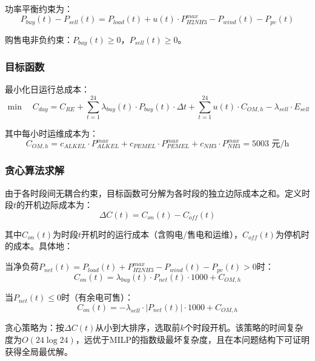 功率平衡约束为：
\begin{equation}
P_{buy}(t) - P_{sell}(t) = P_{load}(t) + u(t) \cdot P_{H2NH3}^{max} - P_{wind}(t) - P_{pv}(t)
\end{equation}

购售电非负约束：$P_{buy}(t) \geq 0$，$P_{sell}(t) \geq 0$。

\subsubsection{目标函数}

最小化日运行总成本：
\begin{equation}\label{eq:q2_obj}
\min \quad C_{day} = C_{RE} + \sum_{t=1}^{24} \lambda_{buy}(t) \cdot P_{buy}(t) \cdot \Delta t + \sum_{t=1}^{24} u(t) \cdot C_{OM,h} - \lambda_{sell} \cdot E_{sell}
\end{equation}

其中每小时运维成本为：
\begin{equation}
C_{OM,h} = c_{ALKEL} \cdot P_{ALKEL}^{max} + c_{PEMEL} \cdot P_{PEMEL}^{max} + c_{NH3} \cdot P_{NH3}^{max} = 5003 \text{ 元/h}
\end{equation}

\subsubsection{贪心算法求解}

由于各时段间无耦合约束，目标函数可分解为各时段的独立边际成本之和。定义时段$t$的开机边际成本为：
\begin{equation}\label{eq:greedy_marginal}
\Delta C(t) = C_{on}(t) - C_{off}(t)
\end{equation}

其中$C_{on}(t)$为时段$t$开机时的运行成本（含购电/售电和运维），$C_{off}(t)$为停机时的成本。具体地：

当净负荷$P_{net}(t) = P_{load}(t) + P_{H2NH3}^{max} - P_{wind}(t) - P_{pv}(t) > 0$时：
\begin{equation}
C_{on}(t) = \lambda_{buy}(t) \cdot P_{net}(t) \cdot 1000 + C_{OM,h}
\end{equation}

当$P_{net}(t) \leq 0$时（有余电可售）：
\begin{equation}
C_{on}(t) = -\lambda_{sell} \cdot |P_{net}(t)| \cdot 1000 + C_{OM,h}
\end{equation}

贪心策略为：按$\Delta C(t)$从小到大排序，选取前$k$个时段开机。该策略的时间复杂度为$O(24\log 24)$，远优于MILP的指数级最坏复杂度，且在本问题结构下可证明获得全局最优解。

